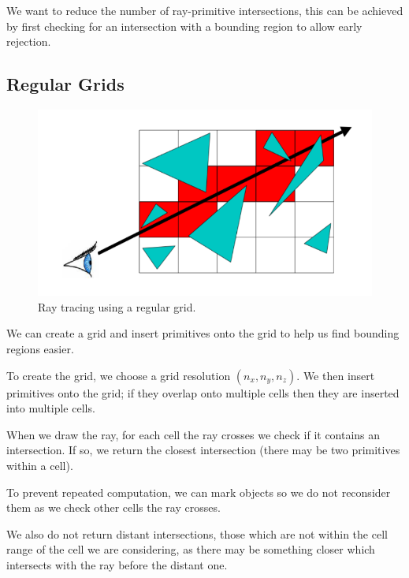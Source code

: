 \documentclass[11pt]{article}
\begin{document}
We want to reduce the number of ray-primitive intersections, this can be achieved by first checking for an intersection with a bounding region to allow early rejection.

\subsection{Regular Grids}
\begin{figure}[htb!]
  \centering
  \caption{Ray tracing using a regular grid.}
  \includegraphics[scale=0.5]{regulargrid}
\end{figure}
We can create a grid and insert primitives onto the grid to help us find bounding regions easier.

To create the grid, we choose a grid resolution $(n_x, n_y, n_z)$.
We then insert primitives onto the grid; if they overlap onto multiple cells then they are inserted into multiple cells.

When we draw the ray, for each cell the ray crosses we check if it contains an intersection.
If so, we return the closest intersection (there may be two primitives within a cell).

To prevent repeated computation, we can mark objects so we do not reconsider them as we check other cells the ray crosses.

We also do not return distant intersections, those which are not within the cell range of the cell we are considering, as there may be something closer which intersects with the ray before the distant one.
\end{document}

